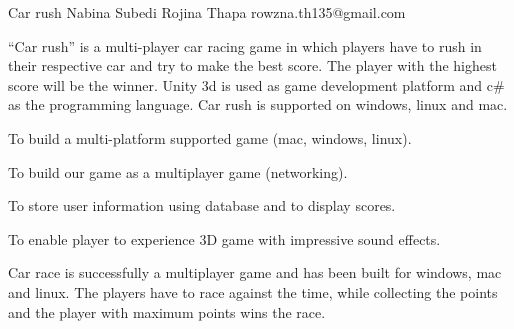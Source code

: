  \begin{conf-abstract}[]
 {Car rush}
 {Nabina Subedi Rojina Thapa
 }
{rowzna.th135@gmail.com}

“Car rush” is a multi-player car racing game in which players have to rush in their respective car and try to make the best score. The player with the highest score will be the winner. Unity 3d is used as game development platform and c\# as the programming language. Car rush is supported on windows, linux and mac. 

To build a multi-platform supported game (mac, windows, linux).

To build our game as a multiplayer game (networking).

To store user information using database and to display scores.

To enable player to experience 3D game with impressive sound effects.

Car race is successfully a multiplayer game and has been built for windows, mac and linux. The players have to race against the time, while collecting the points and the player with maximum points wins the race. 
 \end{conf-abstract}